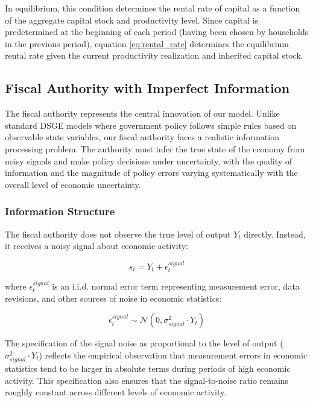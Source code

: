 \documentclass[5p,authoryear]{elsarticle}
\begin{document}
In equilibrium, this condition determines the rental rate of capital as a function of the aggregate capital stock and productivity level. Since capital is predetermined at the beginning of each period (having been chosen by households in the previous period), equation \eqref{eq:rental_rate} determines the equilibrium rental rate given the current productivity realization and inherited capital stock.

\subsection{Fiscal Authority with Imperfect Information}

The fiscal authority represents the central innovation of our model. Unlike standard DSGE models where government policy follows simple rules based on observable state variables, our fiscal authority faces a realistic information processing problem. The authority must infer the true state of the economy from noisy signals and make policy decisions under uncertainty, with the quality of information and the magnitude of policy errors varying systematically with the overall level of economic uncertainty.

\subsubsection{Information Structure}

The fiscal authority does not observe the true level of output $Y_t$ directly. Instead, it receives a noisy signal about economic activity:

\begin{equation}
s_t = Y_t + \epsilon_t^{signal}
\label{eq:signal}
\end{equation}

where $\epsilon_t^{signal}$ is an i.i.d. normal error term representing measurement error, data revisions, and other sources of noise in economic statistics:

\begin{equation}
\epsilon_t^{signal} \sim \mathcal{N}(0, \sigma_{signal}^2 \cdot Y_t)
\label{eq:signal_noise}
\end{equation}

The specification of the signal noise as proportional to the level of output ($\sigma_{signal}^2 \cdot Y_t$) reflects the empirical observation that measurement errors in economic statistics tend to be larger in absolute terms during periods of high economic activity. This specification also ensures that the signal-to-noise ratio remains roughly constant across different levels of economic activity.
\end{document}
